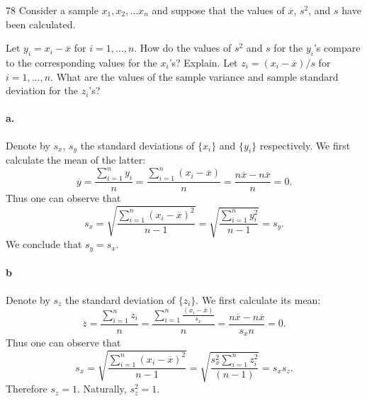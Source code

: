 \documentclass{exam}
\begin{document}
\begin{problem}{78}
	Consider a sample $x_1, x_2, \dots x_n$ and suppose that the values of $\overline x$, $s^2$, and $s$ have been calculated.
	\begin{tasks}[label=\textbf{\alph*.}]
		\task Let $y_i = x_i - \overline x$ for $i = 1, \dots, n$. How do the values of $s^2$ and $s$ for the $y_i$'s compare to the corresponding values for the $x_i$'s? Explain.
		\task Let $z_i = (x_i - \overline x)/s$ for $i = 1, \dots, n$. What are the values of the sample variance and sample standard deviation for the $z_i$'s?
	\end{tasks}
\end{problem}

\paragraph{a.} Denote by $s_x$, $s_y$ the standard deviations of $\{x_i\}$ and $\{y_i\}$ respectively. We first calculate the mean of the latter:
\[
	\overline y = \frac{\displaystyle\sum_{i = 1}^n y_i}n = \frac{\displaystyle\sum_{i = 1}^n (x_i - \overline x)}n = \frac{n\overline x - n\overline x}n = 0.
\]
Thus one can observe that
\[
	s_x = \sqrt{\frac{\displaystyle \sum_{i = 1}^n (x_i - \overline x)^2}{n - 1}} = \sqrt{\frac{\displaystyle \sum_{i = 1}^n y_i^2}{n - 1}} = s_y.
\]
We conclude that $s_y = s_x$.

\paragraph{b} Denote by $s_z$ the standard deviation of $\{z_i\}$. We first calculate its mean:
\[
	\overline z = \frac{\displaystyle\sum_{i = 1}^n z_i}n = \frac{\displaystyle\sum_{i = 1}^n \frac{(x_i - \overline x)}{s_x}}n = \frac{n\overline x - n\overline x}{s_xn} = 0.
\]
Thus one can observe that
\[
	s_x = \sqrt{\frac{\displaystyle \sum_{i = 1}^n (x_i - \overline x)^2}{n - 1}} = \sqrt{\frac{\displaystyle s_x^2\sum_{i = 1}^n z_i^2}{(n - 1)}} = s_xs_z.
\]
Therefore $s_z = 1$. Naturally, $s_z^2 = 1$.
\end{document}
